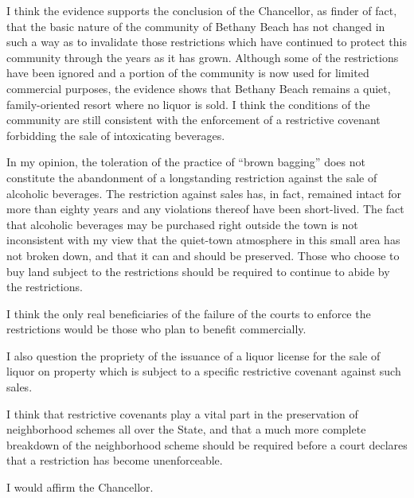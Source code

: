 I think the evidence supports the conclusion of the Chancellor, as finder of
fact, that the basic nature of the community of Bethany Beach has not changed in
such a way as to invalidate those restrictions which have continued to protect
this community through the years as it has grown. Although some of the
restrictions have been ignored and a portion of the community is now used for
limited commercial purposes, the evidence shows that Bethany Beach remains a
quiet, family-oriented resort where no liquor is sold. I think the conditions of
the community are still consistent with the enforcement of a restrictive
covenant forbidding the sale of intoxicating beverages.

In my opinion, the toleration of the practice of ``brown bagging'' does not
constitute the abandonment of a longstanding restriction against the sale of
alcoholic beverages. The restriction against sales has, in fact, remained intact
for more than eighty years and any violations thereof have been short-lived. The
fact that alcoholic beverages may be purchased right outside the town is not
inconsistent with my view that the quiet-town atmosphere in this small area has
not broken down, and that it can and should be preserved. Those who choose to
buy land subject to the restrictions should be required to continue to abide by
the restrictions.

I think the only real beneficiaries of the failure of the courts to enforce the
restrictions would be those who plan to benefit commercially.

I also question the propriety of the issuance of a liquor license for the sale
of liquor on property which is subject to a specific restrictive covenant
against such sales.

I think that restrictive covenants play a vital part in the preservation of
neighborhood schemes all over the State, and that a much more complete breakdown
of the neighborhood scheme should be required before a court declares that a
restriction has become unenforceable.

I would affirm the Chancellor.

